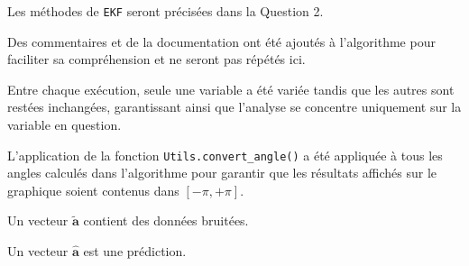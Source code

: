 \documentclass[../CSC_5RO12_TA_TP2.tex]{subfiles}
\begin{document}
Les méthodes de \texttt{EKF} seront précisées dans la Question 2.
\begin{remark}
    Des commentaires et de la documentation ont été ajoutés à l'algorithme pour faciliter sa compréhension et ne seront pas répétés ici.
\end{remark}
\begin{remark}
    Entre chaque exécution, seule une variable a été variée tandis que les autres sont restées inchangées, garantissant ainsi que l'analyse se concentre uniquement sur la variable en question.
\end{remark}
\begin{remark}
    L'application de la fonction \texttt{Utils.convert\_angle()} a été appliquée à tous les angles calculés dans l'algorithme pour garantir que les résultats affichés sur le graphique soient contenus dans $[-\pi, +\pi]$.
\end{remark}
\begin{remark}
    Un vecteur $\widetilde{\mathbf{a}}$ contient des données bruitées.
\end{remark}
\begin{remark}
    Un vecteur $\hat{\mathbf{a}}$ est une prédiction.
\end{remark}

\newpage
\end{document}
